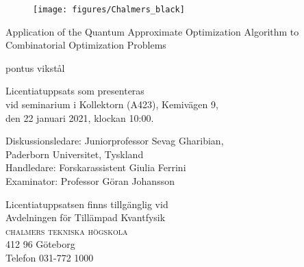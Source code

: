 \documentclass[a4paper,12pt,notitlepage]{article}
\begin{document}
\thispagestyle{empty}
\newcommand{\Title}{Application of the Quantum Approximate Optimization Algorithm to Combinatorial Optimization Problems}
\newcommand{\BrokenTitle}{Application of the quantum approximate optimization algorithm \\ to combinatorial optimization problems}
\newcommand{\Name}{pontus vikstål}
\newcommand{\Division}{Applied Quantum Physics}
\newcommand{\Department}{Department of Microtechnology and Nanoscience}
\newcommand{\Uni}{\protect{Chalmers University of Technology}}
\newcommand{\City}{Göteborg}
\newcommand{\Country}{Sweden}
\newcommand{\Copyrightyear}{2020}
\newcommand{\avdelning}{Avdelningen för Tillämpad Kvantfysik} %
\newcommand{\seminarTime}{22 januari 2021, klockan 10:00} %
\newcommand{\seminarRoom}{Kollektorn (A423)}
\newcommand{\supervisor}{Forskarassistent Giulia Ferrini}
\newcommand{\examiner}{Professor Göran Johansson}
\newcommand{\discussionLeader}{Juniorprofessor Sevag Gharibian, \\ Paderborn Universitet, Tyskland}
\newcommand{\Keywords}{Quantum approximate optimization algorithm, quantum computing, combinatorial optimization}

\begin{center}
    \begin{figure}[h]
        \centering
        \texttt{[image: figures/Chalmers\_black]}
    \end{figure}
    
\vspace{1.6cm}

{\parbox{\textwidth}{\center\Large \Title}}

\vspace{10mm}

{\large\sc \Name}

\vspace{2cm}

{\small
Licentiatuppsats som presenteras \\vid seminarium i \seminarRoom, Kemivägen 9,\\ den \seminarTime.
}

\vspace{8mm}
{\small
Diskussionsledare: \discussionLeader\\ 
\vspace{4mm}
Handledare: \supervisor\\
Examinator: \examiner
}
\vfill

{\small Licentiatuppsatsen finns tillgänglig vid}\\
{\small \avdelning}\\
\textsc{chalmers tekniska högskola}\\
{\small 412 96 Göteborg}\\
{\small Telefon 031-772 1000}\\

\end{center}
\end{document}
